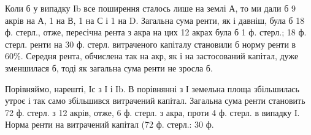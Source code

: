 Коли б у випадку Іb все поширення сталось лише на землі А, то ми
дали б 9 акрів на А, 1 на В, 1 на С і 1 на D. Загальна сума ренти, як і давніш,
була б 18 ф. стерл., отже, пересічна рента з акра на цих 12 акрах
була б 1  ф. стерл.; 18 ф. стерл. ренти на 30 ф. стерл. витраченого капіталу
становили б норму ренти в 60\%. Середня рента, обчислена так на акр,
як і на застосований капітал, дуже зменшилася б, тоді як загальна сума ренти
не зросла б.

Порівняймо, нарешті, Іс з І і Іb. В порівнянні з І земельна площа збільшилась
утроє і так само збільшився витрачений капітал. Загальна сума ренти
становить 72 ф. стерл. з 12 акрів, отже, 6 ф. стерл. з акра, проти 4  ф.
стерл. в випадку І. Норма ренти на витрачений капітал (72 ф. стерл.: 30 ф.
\parbreak{}  %
